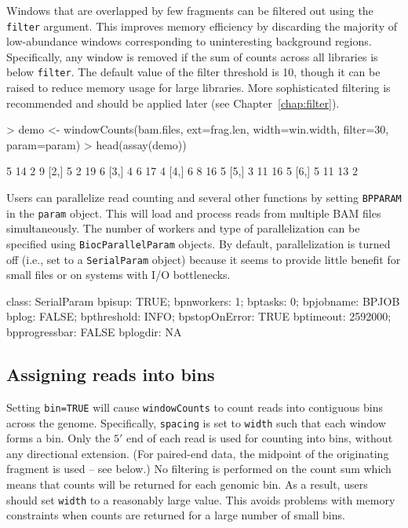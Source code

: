 \documentclass[12pt]{report}
\renewenvironment{Schunk}{\vspace{0pt}}{\vspace{0pt}}
\newcommand{\code}[1]{{\small\texttt{#1}}}
\begin{document}
Windows that are overlapped by few fragments can be filtered out using the \code{filter} argument. 
This improves memory efficiency by discarding the majority of low-abundance windows corresponding to uninteresting background regions. 
Specifically, any window is removed if the sum of counts across all libraries is below \code{filter}.
The default value of the filter threshold is 10, though it can be raised to reduce memory usage for large libraries.
More sophisticated filtering is recommended and should be applied later (see Chapter~\ref{chap:filter}).

\begin{Schunk}
\begin{Sinput}
> demo <- windowCounts(bam.files, ext=frag.len, width=win.width, filter=30, param=param)
> head(assay(demo))
\end{Sinput}
\begin{Soutput}
     [,1] [,2] [,3] [,4]
[1,]    5   14    2    9
[2,]    5    2   19    6
[3,]    4    6   17    4
[4,]    6    8   16    5
[5,]    3   11   16    5
[6,]    5   11   13    2
\end{Soutput}
\end{Schunk}

Users can parallelize read counting and several other functions by setting \code{BPPARAM} in the \code{param} object.
This will load and process reads from multiple BAM files simultaneously.
The number of workers and type of parallelization can be specified using \code{BiocParallelParam} objects.
By default, parallelization is turned off (i.e., set to a \code{SerialParam} object) because it seems to provide little benefit for small files or on systems with I/O bottlenecks.

\begin{Schunk}
\begin{Soutput}
class: SerialParam
  bpisup: TRUE; bpnworkers: 1; bptasks: 0; bpjobname: BPJOB
  bplog: FALSE; bpthreshold: INFO; bpstopOnError: TRUE
  bptimeout: 2592000; bpprogressbar: FALSE
  bplogdir: NA
\end{Soutput}
\end{Schunk}

\subsection{Assigning reads into bins}
Setting \code{bin=TRUE} will cause \code{windowCounts} to count reads into contiguous bins across the genome.
Specifically, \code{spacing} is set to \code{width} such that each window forms a bin.
Only the $5'$ end of each read is used for counting into bins, without any directional extension.
(For paired-end data, the midpoint of the originating fragment is used -- see below.)
No filtering is performed on the count sum which means that counts will be returned for each genomic bin. 
As a result, users should set \code{width} to a reasonably large value.
This avoids problems with memory constraints when counts are returned for a large number of small bins.
\end{document}

